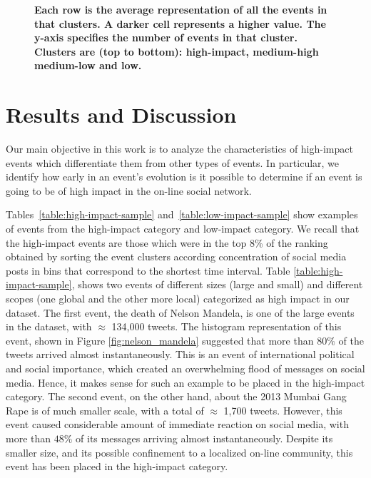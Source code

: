 \documentclass[10pt,letterpaper]{article}
\newcommand{\newtext}[1]{{\leavevmode\color{blue}#1}}
\begin{document}
\begin{figure}
  \caption{\textbf{Each row is the average representation of all the
      events in that clusters.  A darker cell represents a higher
      value.  The y-axis specifies the number of events in that
      cluster.  Clusters are (top to bottom): high-impact, medium-high
      medium-low and low.}
  }
  \label{fig:low_buzz_high_buzz}
\end{figure}

\section*{Results and Discussion}
Our main objective in this work is to analyze the
  characteristics of high-impact events which differentiate them from
  other types of events. In particular, we identify how early in an
  event's evolution is it possible to determine if an event is going
  to be of high impact in the on-line social network.

Tables~\ref{table:high-impact-sample}
and~\ref{table:low-impact-sample} show examples of events from the high-impact category and 
low-impact category. We recall that the high-impact
events are those which were in the top 8\% of the ranking obtained by
sorting the event clusters according concentration of social media
posts in bins that correspond to the shortest time interval.  Table
\ref{table:high-impact-sample}, shows two events of different sizes
(large and small) and different scopes (one global and the other more local)
categorized as high impact in our dataset. The first event, the death
of Nelson Mandela, is one of the large events in the dataset, with
$\approx$ 134,000 tweets. The histogram representation of this event,
shown in Figure \ref{fig:nelson_mandela} suggested that more than $80\%$ of
the tweets arrived almost instantaneously. This is an event of
international political and social importance, which created an
overwhelming flood of messages on social media.  Hence, it makes sense
for such an example to be placed in the high-impact category.  The
second event, on the other hand, about the 2013 Mumbai Gang Rape is of
much smaller scale, with a total of $\approx$ 1,700 tweets.  However,
this event caused considerable amount of immediate reaction on social
media, with more than $48\%$ of its messages arriving almost
instantaneously.  Despite its smaller size, and its possible
confinement to a localized on-line community, this event has been
placed in the high-impact category.
\end{document}
